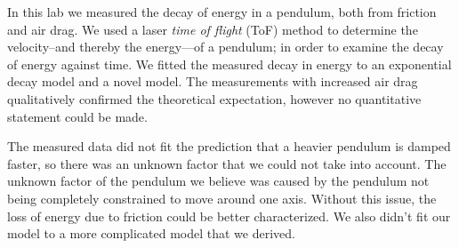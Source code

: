 In this lab we measured the decay of energy in a pendulum, both from friction and air drag.
We used a laser \emph{time of flight} (ToF) method to determine the velocity--and thereby the energy---of
a pendulum; in order to examine the decay of energy against time.
We fitted the measured decay in energy to an exponential decay model and a novel model. 
The measurements with increased air drag qualitatively confirmed the theoretical expectation, however no quantitative statement could be made. 
	
The measured data did not fit the prediction that a heavier pendulum is damped faster, so there was an unknown factor that we could not take into account.
The unknown factor of the pendulum we believe was caused by the pendulum not being completely 
constrained to move around one axis. Without this issue, the loss of energy due to friction could be better characterized.
We also didn't fit our model to a more complicated model that we derived.
